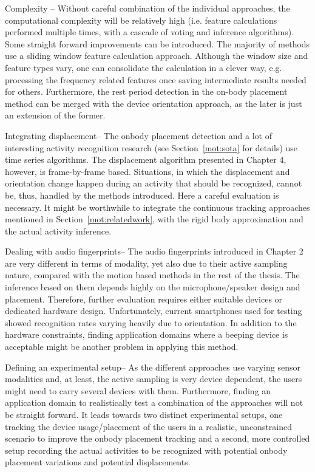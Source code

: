 \begin{description}
\item{Complexity} -- Without careful combination of the individual approaches,
the computational complexity will be relatively high (i.e. feature calculations performed multiple times,
with a cascade of voting and inference algorithms).
Some straight forward improvements can be introduced. The majority of
methods use a sliding window feature calculation approach. Although the window size and
feature types vary, one can consolidate the calculation in a clever way, e.g.
processing the frequency related features once saving intermediate results needed
for others. Furthermore, the rest period detection in the on-body placement method
can be merged with the device orientation approach, as the later is just an extension
of the former. 
\item{Integrating displacement}-- The onbody placement detection and a lot of interesting activity recognition
research (see Section~\ref{mot:sota} for details) use time series algorithms. The displacement 
algorithm presented in Chapter 4, however, is frame-by-frame based.
Situations, in which the displacement and orientation change happen during an activity 
that should be recognized, cannot be, thus, handled by the methods introduced.
Here a careful evaluation is necessary. It might be worthwhile to integrate the 
continuous tracking approaches mentioned in Section~\ref{mot:relatedwork}, with the rigid body approximation
and the actual activity inference.
\item{Dealing with audio fingerprints}-- The audio fingerprints introduced
in Chapter 2 are very different in terms of modality, yet also due to their active sampling nature,
compared with the motion based methods in the rest of the thesis. The inference based
on them depends highly on the microphone/speaker design and placement. Therefore, further 
evaluation requires either suitable devices or dedicated hardware design. 
Unfortunately, current smartphones used for testing showed recognition rates varying heavily
due to orientation. In addition to the hardware constraints, finding application domains
where a beeping device is acceptable might be another problem in applying this method.
\item{Defining an experimental setup}-- As the different approaches use
varying sensor modalities and, at least, the active sampling is very device dependent,
 the users might need to carry several devices with them. Furthermore, finding an application
domain to realistically test a combination of the approaches will not be straight forward.
It leads towards two distinct experimental setups, one tracking the device usage/placement 
of the users in a realistic, unconstrained scenario to improve the onbody placement tracking
and a second, more controlled setup recording the actual activities to be recognized with potential
onbody placement variations and potential displacements.

\end{description} 



